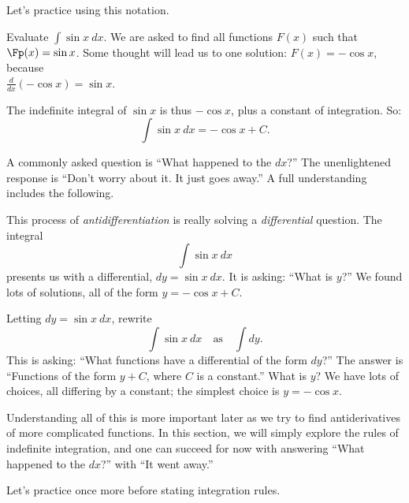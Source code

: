 Let's practice using this notation.

\begin{example}\label{ex_anti2}
Evaluate $\displaystyle \int \sin x\ dx$.
\solution
We are asked to find all functions $F(x)$ such that $\Fp(x) = \sin x$. Some thought will lead us to one solution: $F(x) = -\cos x$, because\\
$\frac{d}{dx}(-\cos x) = \sin x$.

The indefinite integral of $\sin x$ is thus $-\cos x$, plus a constant of integration. So:
\[\int \sin x \ dx = -\cos x + C.\]
\end{example}

A commonly asked question is ``What happened to the $dx$?'' The unenlightened response is ``Don't worry about it. It just goes away.'' A full understanding includes the following.


This process of \textit{antidifferentiation} is really solving a \textit{differential} question. The integral
\[\int \sin x\ dx\]
presents us with a differential, $dy = \sin x\ dx$. It is asking: ``What is $y$?'' We found lots of solutions, all of the form $y = -\cos x+C$.

Letting $dy = \sin x\ dx$,  rewrite 
\[\int \sin x \ dx \quad \text{as}\quad \int  dy.\]
This is asking: ``What functions have a differential of the form $dy$?'' The answer is ``Functions of the form $y+C$, where $C$ is a constant.'' What is $y$? We have lots of choices, all differing by a constant; the simplest choice is $y = -\cos x$.

Understanding all of this is more important later as we try to find antiderivatives of more complicated functions. In this section, we will simply explore the rules of indefinite integration, and one can succeed for now with answering ``What happened to the $dx$?'' with ``It went away.''

Let's practice once more before stating integration rules.

